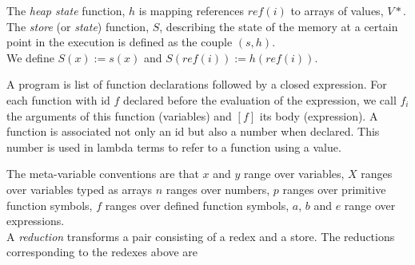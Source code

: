 \documentclass[12pt,a4paper]{article}
\begin{document}
The \emph{heap state} function, $h$ is mapping references $ref(i)$ to arrays of values, $V*$.\\

The \emph{store} (or \emph{state}) function, $S$, describing the state of the memory at a certain point in the execution is defined as the couple $(s, h)$.\\
We define $S(x) := s(x)$ and $S(ref(i)) := h(ref(i))$.

A program is list of function declarations followed by a closed expression. For each function with id $f$ declared before the evaluation of the expression, we call $f_i$ the arguments of this function (variables) and $[f]$ its body (expression). A function is associated not only an id but also a number when declared. This number is used in lambda terms to refer to a function using a value.

The meta-variable conventions are that $x$ and $y$ range over variables, $X$ ranges over variables typed as arrays $n$ ranges over numbers, $p$ ranges over primitive function symbols, $f$ ranges over defined function symbols, $a$, $b$ and $e$ range over expressions. \\

A \emph{reduction} transforms a pair consisting of a redex and a store. The reductions corresponding to the redexes above are
\end{document}
